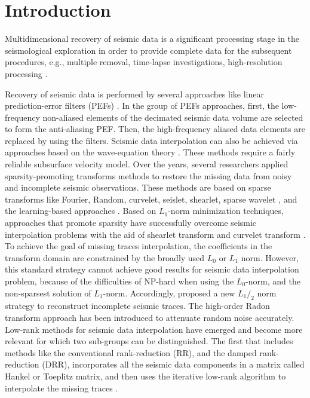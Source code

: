 \section{Introduction}
Multidimensional recovery of seismic data is a significant processing stage in the seismological exploration in order to provide complete data for the subsequent procedures, e.g., multiple removal, time-lapse investigations, high-resolution processing \citep{chiu2014multidimensional}. 

Recovery of seismic data is performed by several approaches like linear prediction-error filters (PEFs) \citep{porsani1999seismic,curry2003interpolation,gulunay2003seismic,liu2015adaptive,fomel2016streaming,li2017multidimensional}. In the group of PEFs approaches, first, the low-frequency non-aliased elements of the decimated seismic data volume are selected to form the anti-aliasing PEF. Then, the high-frequency aliased data elements are replaced by using the filters. Seismic data interpolation can also be achieved via approaches based on the wave-equation theory \citep{fomel2003seismic}. These methods require a fairly reliable subsurface velocity model. Over the years, several researchers applied sparsity-promoting transforms methods to restore the missing data from noisy and incomplete seismic observations. These methods are based on sparse transforms like Fourier, Random, curvelet, seislet, shearlet, sparse wavelet  \citep{gan2015seismic,gan2015dealiased,liu2015seismic,zhong2015irregularly,gan2016compressive,kong2016seismic,li2016unconventional,liu2016effective,liu2016one,liu2016seismic,sun2016constraints,zu2016periodically,xue2017amplitude}, and the learning-based approaches \citep{yangkang2020sgk,wanghang2020tgrs3}. Based on $L_1$-norm minimization techniques, approaches that promote sparsity have successfully overcome seismic interpolation problems with the aid of shearlet transform and curvelet transform \citep{shahidi2013application}. To achieve the goal of missing traces interpolation, the coefficients in the transform domain are constrained by the broadly used $L_0$ or $L_1$ norm. However, this standard strategy cannot achieve good results for seismic data interpolation problem, because of the difficulties of NP-hard when using the $L_0$-norm, and the non-sparsest solution of $L_1$-norm. Accordingly, \cite{zhong2015irregularly} proposed a new $L_1/_2$ norm strategy to reconstruct incomplete seismic traces. The high-order Radon transform approach \citep{xue2017amplitude} has been introduced to attenuate random noise accurately. Low-rank methods for seismic data interpolation have emerged and become more relevant for which two sub-groups can be distinguished. The first that includes methods like the conventional rank-reduction (RR), and the damped rank-reduction (DRR), incorporates all the seismic data components in a matrix called Hankel or Toeplitz matrix, and then uses the iterative low-rank algorithm to interpolate the missing traces \citep{oropeza2011simultaneous,chen2016simultaneous,huang2017double,siahsar2017simultaneous,zhang2017hybrid,huang2018damped,chen2019five,oboue2020geo1}.
